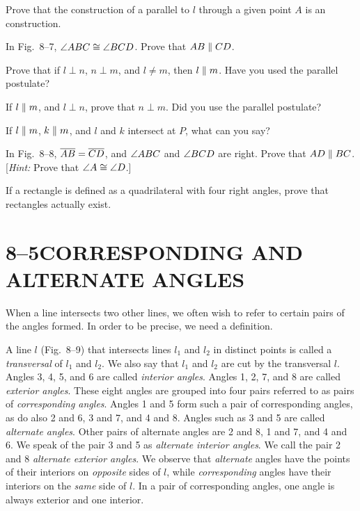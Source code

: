 \documentclass[11pt]{book}
\begin{document}
\begin{exercisecols}
\begin{exlist}
\item Prove that the construction of a parallel to $l$ through a given point
  $A$ is an \RC{} construction.
\item In Fig.~8--7, $\angle ABC \cong \angle BCD$. Prove that $AB \mathrel{\|} CD$.
\exfig{\FIGVIIISEVEN}
\item Prove that if $l \perp n$, $n \perp m$, and $l \neq m$, then
  $l \mathrel{\|} m$. Have you used the parallel postulate?
\item If $l \mathrel{\|} m$, and $l \perp n$, prove that $n \perp m$. Did you use the
  parallel postulate?
\item If $l \mathrel{\|} m$, $k \mathrel{\|} m$, and $l$ and $k$ intersect at $P$, what can
  you say?
\item[\stex 6.] In Fig.~8--8, $\overline{AB} = \overline{CD}$, and $\angle ABC$ and
  $\angle BCD$ are right. Prove that $AD \mathrel{\|} BC$. [\emph{Hint:} Prove that
  $\angle A \cong \angle D$.]
\exfig{\FIGVIIIEIGHT}
\item[\stex 7.] If a rectangle is defined as a quadrilateral with four right
  angles, prove that rectangles actually exist.
\end{exlist}
\end{exercisecols}

\section*{8--5\quad CORRESPONDING AND\\ALTERNATE ANGLES}

When a line intersects two other lines, we often wish to refer to certain
pairs of the angles formed. In order to be precise, we need a definition.

\begin{definition}
A line $l$ (Fig.~8--9) that intersects lines $l_1$ and $l_2$ in distinct
points is called a \emph{transversal} of $l_1$ and $l_2$. We also say that
$l_1$ and $l_2$ are cut by the transversal $l$. Angles 3, 4, 5, and 6 are
called \emph{interior angles}. Angles 1, 2, 7, and 8 are called \emph{exterior
angles}. These eight angles are grouped into four pairs referred to as pairs
of \emph{corresponding angles}. Angles 1 and 5 form such a pair of
corresponding angles, as do also 2 and 6, 3 and 7, and 4 and 8. Angles such as
3 and 5 are called \emph{alternate angles}. Other pairs of alternate angles
are 2 and 8, 1 and 7, and 4 and 6. We speak of the pair 3 and 5 as
\emph{alternate interior angles}. We call the pair 2 and 8 \emph{alternate
exterior angles}. We observe that \emph{alternate} angles have the points of
their interiors on \emph{opposite} sides of $l$, while \emph{corresponding}
angles have their interiors on the \emph{same} side of $l$. In a pair of
corresponding angles, one angle is always exterior and one interior.
\end{definition}
\end{document}
